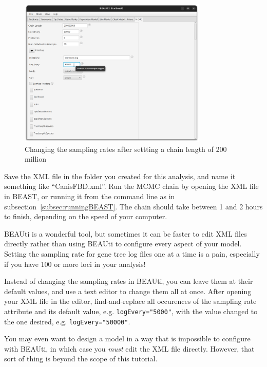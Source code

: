 \documentclass[12pt]{article}
\begin{document}
\begin{figure}[htb!]
\centering
\includegraphics[width=0.8\textwidth]{figures/samplingRate.png}
\caption
{Changing the sampling rates after settting a chain length of 200 million}
\label{fig:samplingRate}
\end{figure}

Save the XML file in the folder you created for this analysis, and name it
something like ``CanisFBD.xml''. Run the MCMC chain by opening the XML file in
BEAST, or running it from the command line as in
subsection~\ref{subsec:runningBEAST}. The chain should take between 1 and 2 hours to
finish, depending on the speed of your computer.

\begin{tcolorbox}[colback=orange!5,colframe=orange!40!black,title=Editing BEAST XML files]
BEAUti is a wonderful tool, but sometimes it can be faster to edit XML files directly rather than using BEAUti to configure every aspect of your model. Setting the sampling rate for gene tree log files one at a time is a pain, especially if you have 100 or more loci in your analysis!

Instead of changing the sampling rates in BEAUti, you can leave them at their default values, and use a text editor to change them all at once. After opening your XML file in the editor, find-and-replace all occurences of the sampling rate attribute and its default value, e.g. \texttt{logEvery="5000"}, with the value changed to the one desired, e.g. \texttt{logEvery="50000"}.

You may even want to design a model in a way that is impossible to configure with BEAUti, in which case you \textit{must} edit the XML file directly. However, that sort of thing is beyond the scope of this tutorial.
\end{tcolorbox}
\end{document}
